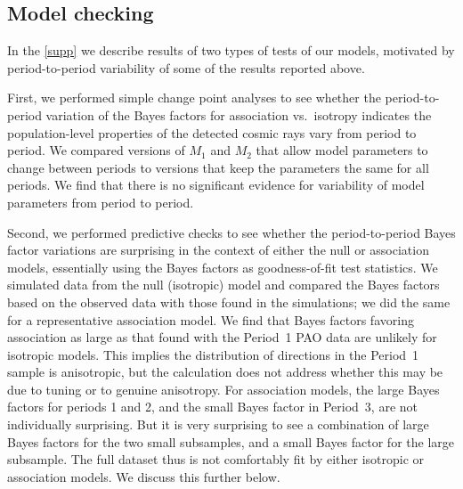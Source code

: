 \documentclass[dvips,aoas,preprint]{imsart}
\newcommand\cmdname[1]{{\tt \textbackslash#1}}
\newcommand\enote[1]{{$\bullet\bullet\bullet$}{\sl [#1]}{$\bullet\bullet\bullet$}}
\begin{document}











\subsection{Model checking}

In the \ref{supp} we describe results of two types of
tests of our models, motivated by period-to-period variability of some of
the results reported above.

First, we performed simple change point analyses to see whether the
period-to-period variation of the Bayes factors for association vs.\ isotropy
indicates the population-level properties of the detected cosmic rays vary
from period to period.  We compared versions of $M_1$ and $M_2$ that allow
model parameters to change between periods to versions that keep the
parameters the same for all periods.  We find that there is no significant
evidence for variability of model parameters from period to period.  


Second, we performed predictive checks to see whether the period-to-period
Bayes factor variations are surprising in the context of either the null or
association models, essentially using the Bayes factors as goodness-of-fit
test statistics.  
We simulated data from the null (isotropic) model and compared the Bayes
factors based on the observed data with those found in the simulations; we
did the same for a representative association model.
We find that Bayes factors favoring association as large as that
found with the Period~1 PAO data are unlikely for
isotropic models.
This implies the distribution of directions in the Period~1 sample is
anisotropic, but the calculation does not address whether this may be due to
tuning or to genuine anisotropy.
For association models, the large Bayes factors for periods 1 and 2,
and the small Bayes factor in Period~3, are not individually surprising.
But it is very surprising to see a combination of large Bayes factors
for the two small subsamples, and a small Bayes factor for the large
subsample.  The full dataset thus is not comfortably fit by either
isotropic or association models.  We discuss this further below.
\end{document}
